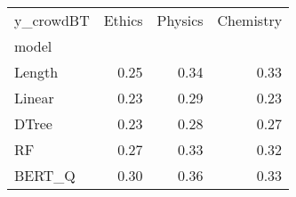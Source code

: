 \begin{tabular}{lrrr}
\toprule
y\_crowdBT &  Ethics &  Physics &  Chemistry \\
model  &         &          &            \\
\midrule
Length &    0.25 &     0.34 &       0.33 \\
Linear &    0.23 &     0.29 &       0.23 \\
DTree  &    0.23 &     0.28 &       0.27 \\
RF     &    0.27 &     0.33 &       0.32 \\
BERT\_Q &    0.30 &     0.36 &       0.33 \\
\bottomrule
\end{tabular}
